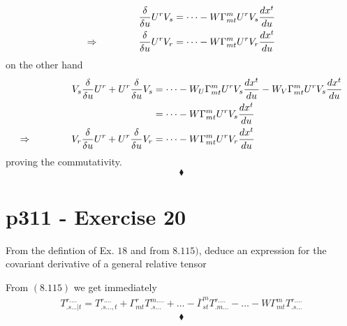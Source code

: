 \begin{align}
\fdv{}{u}U^rV_s &= \dots -W\Gamma^m_{mt}U^rV_s\dv{x^t}{u}\\
\Rightarrow \spatie \fdv{}{u}U^rV_r &= \dots -W\Gamma^m_{mt}U^rV_r\dv{x^t}{u}\\
\end{align}
on the other hand 
\begin{align}
V_s\fdv{}{u}U^r+ U^r\fdv{}{u}V_s &= \dots -W_U\Gamma^m_{mt}U^rV_s\dv{x^t}{u}-W_V\Gamma^m_{mt}U^rV_s\dv{x^t}{u}\\
&= \dots -W\Gamma^m_{mt}U^rV_s\dv{x^t}{u}\\
\Rightarrow \spatie V_r\fdv{}{u}U^r+ U^r\fdv{}{u}V_r &= \dots -W\Gamma^m_{mt}U^rV_r\dv{x^t}{u}\\
\end{align}
proving the commutativity.
$$\blacklozenge$$
\newpage




\section{p311 - Exercise 20}
\begin{tcolorbox}
From the defintion of Ex. $18$ and from $\mathbf{8.115)}$, deduce an expression for the covariant derivative of a general relative tensor 
\end{tcolorbox}
From $\mathbf{(8.115)}$ we get immediately
\begin{align*}
T^{r . \dots}_{.s\dots|t} = T^{r . \dots}_{.s\dots,t}+\Gamma^r_{mt}T^{m . \dots}_{.s\dots}+ \dots -\overline{\Gamma}^m_{st}T^{r . \dots}_{.m\dots}-\dots -W\Gamma^m_{mt}T^{r . \dots}_{.s\dots}
\end{align*}
$$\blacklozenge$$
\newpage



